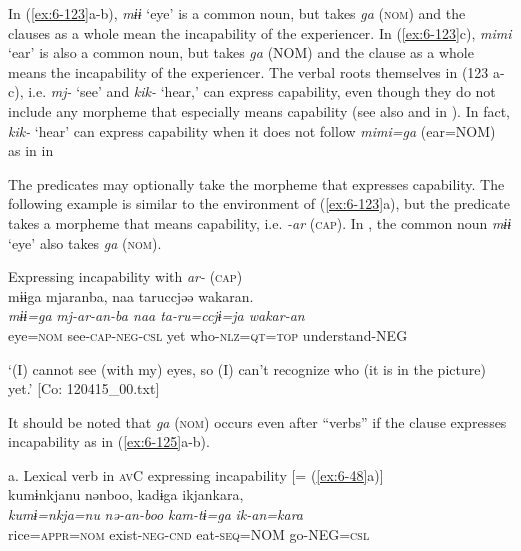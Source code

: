 \begin{table}
\begin{styleBeschriftung}
In (\ref{ex:6-123}a-b), \textit{mɨɨ} ‘eye’ is a common noun, but takes \textit{ga} (\textsc{nom}) and the clauses as a whole mean the incapability of the experiencer. In (\ref{ex:6-123}c), \textit{mimi} ‘ear’ is also a common noun, but takes \textit{ga} (NOM) and the clause as a whole means the incapability of the experiencer. The verbal roots themselves in (123 a-c), i.e. \textit{mj-} ‘see’ and \textit{kik-} ‘hear,’ can express capability, even though they do not include any morpheme that especially means capability (see also  and  in ). In fact, \textit{kik-} ‘hear’ can express capability when it does not follow \textit{mimi=ga} (ear=NOM) as in  in 

The predicates may optionally take the morpheme that expresses capability. The following example is similar to the environment of (\ref{ex:6-123}a), but the predicate takes a morpheme that means capability, i.e. \textit{-ar} (\textsc{cap}). In , the common noun \textit{mɨɨ} ‘eye’ also takes \textit{ga} (\textsc{nom}).

\ea\label{ex:6-124}
 Expressing incapability with \textit{ar-} (\textsc{cap})\\

{\TM}
\glll mɨɨga  mjaranba,  naa  taruccjəə  wakaran.\\
\textit{mɨɨ=ga}  \textit{mj-ar-an-ba  naa  ta-ru=ccjɨ=ja  wakar-an}\\

    eye=\textsc{nom}  see-\textsc{cap}-\textsc{neg}-\textsc{csl}  yet  who-\textsc{nlz}=\textsc{qt}=\textsc{top}  understand-NEG

\glt    ‘(I) cannot see (with my) eyes, so (I) can’t recognize who (it is in the picture) yet.’ [Co: 120415\_00.txt]
\z

It should be noted that \textit{ga} (\textsc{nom}) occurs even after “verbs” if the clause expresses incapability as in (\ref{ex:6-125}a-b).

\ea\label{ex:6-125}
 a. Lexical verb in \textsc{av}C expressing incapability [= (\ref{ex:6-48}a)]\\

{\TM}
\glll kumɨnkjanu  nənboo,  kadɨga  ikjankara,\\
\textit{kumɨ=nkja=nu}  \textit{nə-an-boo}  \textit{kam-tɨ=ga}  \textit{ik-an=kara}\\

    rice=\textsc{appr}=\textsc{nom}  exist-\textsc{neg}-\textsc{cnd}  eat-\textsc{seq}=NOM  go-NEG=\textsc{csl}


\end{styleBeschriftung}
\end{table}
